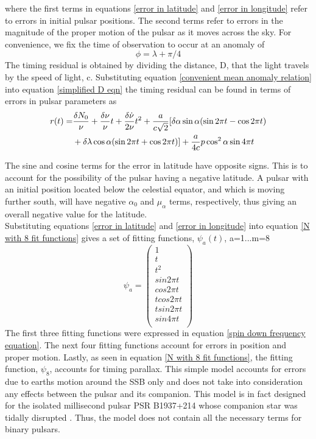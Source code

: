 \documentclass[12pt]{article}
\begin{document}
	where the first terms in equations \ref{error in latitude} and \ref{error in longitude} refer to errors in initial pulsar positions. The second terms refer to errors in the magnitude of the proper motion of the pulsar as it moves across the sky. For convenience, we fix the time of observation to occur at an anomaly of 
	\begin{equation}\label{convenient mean anomaly relation}
	\phi=\lambda +\pi/4
	\end{equation}
	The timing residual is obtained by dividing the distance, D, that the light travels by the speed of light, c. Substituting equation \ref{convenient mean anomaly relation} into equation \ref{simplified D eqn} the timing residual can be found in terms of errors in pulsar parameters as
	\begin{equation}{\label{N with 8 fit functions}}
	\begin{aligned}
	r(t)=&\frac{\delta N_{0}}{\nu}+\frac{\delta \nu}{\nu}t+\frac{\delta \dot\nu }{2 \nu}t^2+\frac{a}{c \sqrt{2}}[\delta\alpha \sin{\alpha}(\sin{2 \pi t}-\cos{2 \pi t})\\
	&+\delta\lambda \cos{\alpha}(\sin{2 \pi t}+\cos{2 \pi t})] +\frac{a}{4c}p\cos^{2}\alpha \sin{4 \pi t}
	\end{aligned}
	\end{equation}
	
	The sine and cosine terms for the error in latitude have opposite signs. This is to account for the possibility of the pulsar having a negative latitude. A pulsar with an initial position located below the celestial equator, and which is moving further south, will have negative $\alpha_{0}$ and $\mu_{\alpha}$ terms, respectively, thus giving an overall negative value for the latitude.\\
	Substituting equations \ref{error in latitude} and \ref{error in longitude} into equation \ref{N with 8 fit functions} gives a set of fitting functions, $\psi_a(t)$, a=1...m=8 \cite{blandford1976arrival} 
	$$
	\psi_a=
	\begin{pmatrix}
	1\\
	t\\
	t^2\\
	sin2 \pi t\\
	cos2 \pi t\\
	t cos2 \pi t\\
	t sin2 \pi t\\
	sin4 \pi t\\
	\end{pmatrix}
	$$
	The first three fitting functions were expressed in equation \ref{spin down frequency equation}. The next four fitting functions account for errors in position and proper motion. Lastly, as seen in equation \ref{N with 8 fit functions}, the fitting function, $\psi_{8}$, accounts for timing parallax. 
	This simple model accounts for  errors due to earths motion around the SSB only and does not take into consideration any effects between the pulsar and its companion. This model is in fact designed for the isolated millisecond pulsar PSR B1937+214 whose companion star was tidally disrupted \cite{kochhar1984model}. Thus, the model does not contain all the necessary terms for binary pulsars.\\
	
\end{document}
